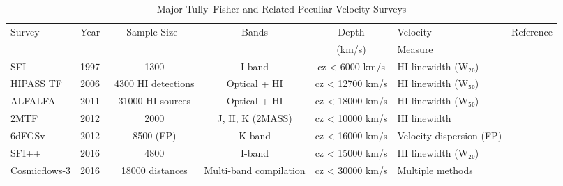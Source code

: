 \begin{table*}
\centering
\caption{Major Tully–Fisher and Related Peculiar Velocity Surveys}
\label{tab:survey_comparison}
\begin{tabular}{llcccll}
\hline
Survey & Year & Sample Size & Bands & Depth & Velocity & Reference \\
       &      &             &       & (km/s) & Measure  &           \\
\hline
SFI & 1997 & ~1300 & I-band & cz < 6000 km/s & HI linewidth (W₂₀) & \citet{giovanelli1997sfi} \\
HIPASS TF & 2006 & ~4300 HI detections & Optical + HI & cz < 12700 km/s & HI linewidth (W₅₀) & \citet{koribalski2004hipass} \\
ALFALFA & 2011 & ~31000 HI sources & Optical + HI & cz < 18000 km/s & HI linewidth (W₅₀) & \citet{haynes2011alfalfa} \\
2MTF & 2012 & ~2000 & J, H, K (2MASS) & cz < 10000 km/s & HI linewidth & \citet{hong2012tf} \\
6dFGSv & 2012 & ~8500 (FP) & K-band & cz < 16000 km/s & Velocity dispersion (FP) & \citet{springob20126dfgsv} \\
SFI++ & 2016 & ~4800 & I-band & cz < 15000 km/s & HI linewidth (W₂₀) & \citet{springob2016sfi++} \\
Cosmicflows-3 & 2016 & ~18000 distances & Multi-band compilation & cz < 30000 km/s & Multiple methods & \citet{tully2016cosmicflows3} \\
\hline
\end{tabular}
\end{table*}